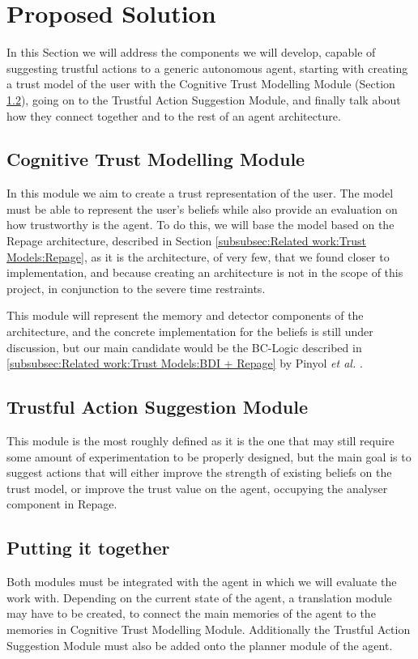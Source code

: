 \section{Proposed Solution}
\label{sec:Solution}
In this Section we will address the components we will develop, capable of suggesting trustful actions to a generic autonomous agent, starting with creating a trust model of the user with the Cognitive Trust Modelling Module (Section \ref{subsec:Solution:Trust Decision Making Module}), going on to the Trustful Action Suggestion Module, and finally talk about how they connect together and to the rest of an agent architecture.


\subsection{Cognitive Trust Modelling Module}
\label{subsec:Solution:Trust Assessment Module}
In this module we aim to create a trust representation of the user. The model must be able to represent the user's beliefs while also provide an evaluation on how trustworthy is the agent. To do this, we will base the model based on the Repage architecture, described in Section \ref{subsubsec:Related work:Trust Models:Repage}, as it is the architecture, of very few, that we found closer to implementation, and because creating an architecture is not in the scope of this project, in conjunction to the severe time restraints.

This module will represent the memory and detector components of the architecture, and the concrete implementation for the beliefs is still under discussion, but our main candidate would be the BC-Logic described in \ref{subsubsec:Related work:Trust Models:BDI + Repage} by Pinyol \textit{et al.} \cite{Pinyol2009}.

\subsection{Trustful Action Suggestion Module}
\label{subsec:Solution:Trust Decision Making Module}
This module is the most roughly defined as it is the one that may still require some amount of experimentation to be properly designed, but the main goal is to suggest actions that will either improve the strength of existing beliefs on the trust model, or improve the trust value on the agent, occupying the analyser component in Repage.

\subsection{Putting it together}
Both modules must be integrated with the agent in which we will evaluate the work with. Depending on the current state of the agent, a translation module may have to be created, to connect the main memories of the agent to the memories in Cognitive Trust Modelling Module. Additionally the Trustful Action Suggestion Module must also be added onto the planner module of the agent.